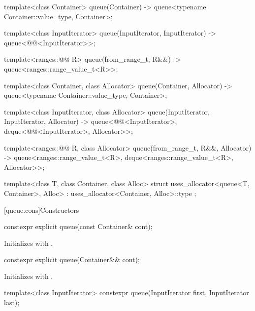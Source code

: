 \begin{codeblock}
{  template<class Container>
    queue(Container) -> queue<typename Container::value_type, Container>;

  template<class InputIterator>
    queue(InputIterator, InputIterator) -> queue<@@<InputIterator>>;

  template<ranges::@@ R>
    queue(from_range_t, R&&) -> queue<ranges::range_value_t<R>>;

  template<class Container, class Allocator>
    queue(Container, Allocator) -> queue<typename Container::value_type, Container>;

  template<class InputIterator, class Allocator>
    queue(InputIterator, InputIterator, Allocator)
      -> queue<@@<InputIterator>, deque<@@<InputIterator>,
               Allocator>>;

  template<ranges::@@ R, class Allocator>
    queue(from_range_t, R&&, Allocator)
      -> queue<ranges::range_value_t<R>, deque<ranges::range_value_t<R>, Allocator>>;

  template<class T, class Container, class Alloc>
    struct uses_allocator<queue<T, Container>, Alloc>
      : uses_allocator<Container, Alloc>::type { };
}
\end{codeblock}

[queue.cons]{Constructors}

%
\begin{itemdecl}
constexpr explicit queue(const Container& cont);
\end{itemdecl}

\begin{itemdescr}
\pnum
\effects
Initializes  with .
\end{itemdescr}

%
\begin{itemdecl}
constexpr explicit queue(Container&& cont);
\end{itemdecl}

\begin{itemdescr}
\pnum
\effects
Initializes  with .
\end{itemdescr}

%
\begin{itemdecl}
template<class InputIterator>
  constexpr queue(InputIterator first, InputIterator last);
\end{itemdecl}

